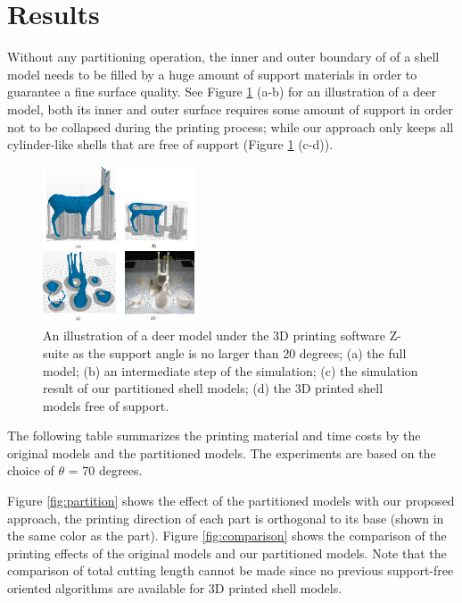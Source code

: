 \section{Results}

Without any partitioning operation, the inner and outer boundary of of a shell model needs to be filled by a huge amount of support materials in order to guarantee a fine surface quality. See Figure \ref{fig:dear-simulation} (a-b) for an illustration of a deer model, both its inner and outer surface requires some amount of support in order not to be collapsed during the printing process; while our approach only keeps all cylinder-like shells that are free of support (Figure \ref{fig:dear-simulation} (c-d)).

\begin{figure}[tbp]
  \centering
  \mbox{} \hfill
  \includegraphics[width=0.4\textwidth]{figs/dear-simulation.png}
  \caption{\label{fig:dear-simulation}%
           An illustration of a deer model under the 3D printing software Z-suite as the support angle is no larger than 20 degrees; (a) the full model; (b) an intermediate step of the simulation; (c) the simulation result of our partitioned shell models; (d) the 3D printed shell models free of support.}
\end{figure}


The following table summarizes the printing material and time costs by the original models and the partitioned models. The experiments are based on the choice of $\theta$ = 70 degrees. 


Figure \ref{fig:partition} shows the effect of the partitioned models with our proposed approach, the printing direction of each part is orthogonal to its base (shown in the same color as the part). Figure \ref{fig:comparison} shows the comparison of the printing effects of the original models and our partitioned models. Note that the comparison of total cutting length cannot be made since no previous support-free oriented algorithms are available for 3D printed shell models.




